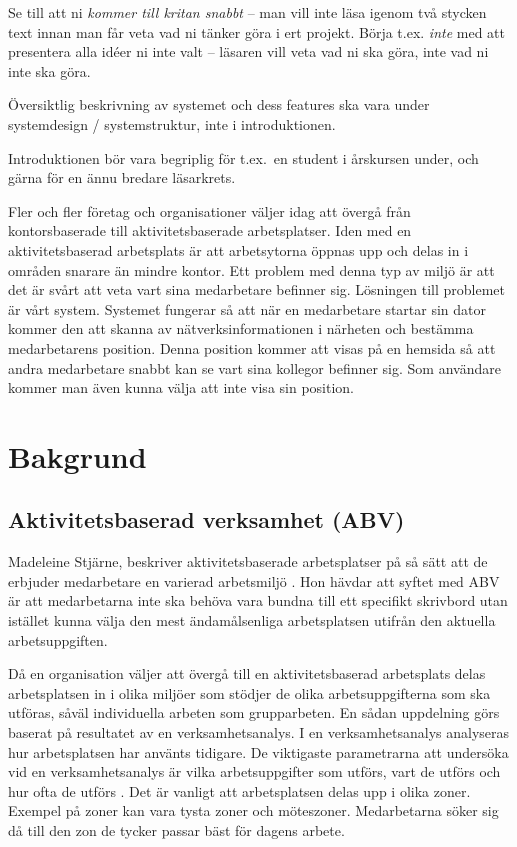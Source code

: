 \documentclass[swedish, a4paper,12pt]{article}
\begin{document}
Se till att ni \emph{kommer till kritan snabbt} – man vill inte läsa igenom två stycken text innan man får veta vad ni tänker göra i ert projekt.  Börja t.ex. \emph{inte} med att presentera alla idéer ni inte valt – läsaren vill veta vad ni ska göra, inte vad ni inte ska göra.

Översiktlig beskrivning av systemet och dess features ska vara under systemdesign / systemstruktur, inte i introduktionen.

Introduktionen bör vara begriplig för t.ex.~en student i årskursen under, och gärna för en ännu bredare läsarkrets.
\fi

Fler och fler företag och organisationer väljer idag att övergå från kontorsbaserade till aktivitetsbaserade arbetsplatser. Iden med en aktivitetsbaserad arbetsplats är att arbetsytorna öppnas upp och delas in i områden snarare än mindre kontor. Ett problem med denna typ av miljö är att det är svårt att veta vart sina medarbetare befinner sig. Lösningen till problemet är vårt system. Systemet fungerar så att när en medarbetare startar sin dator kommer den att skanna av nätverksinformationen i närheten och bestämma medarbetarens position. Denna position kommer att visas på en hemsida så att andra medarbetare snabbt kan se vart sina kollegor befinner sig. Som användare kommer man även kunna välja att inte visa sin position.

\section{Bakgrund}
\subsection{Aktivitetsbaserad verksamhet (ABV)}
Madeleine Stjärne, beskriver aktivitetsbaserade arbetsplatser på så sätt att de erbjuder medarbetare en varierad arbetsmiljö \cite{ABV}. Hon hävdar att syftet med ABV är att medarbetarna inte ska behöva vara bundna till ett specifikt skrivbord utan istället kunna välja den mest ändamålsenliga arbetsplatsen utifrån den aktuella arbetsuppgiften. %

Då en organisation väljer att övergå till en aktivitetsbaserad arbetsplats
delas arbetsplatsen in i olika miljöer som stödjer de olika arbetsuppgifterna som ska utföras, såväl individuella arbeten som grupparbeten. En sådan uppdelning görs baserat på resultatet av en verksamhetsanalys. I en verksamhetsanalys analyseras hur arbetsplatsen har använts tidigare. De viktigaste parametrarna att undersöka vid en verksamhetsanalys är vilka arbetsuppgifter som utförs, vart de utförs och hur ofta de utförs \cite{ABV}.
Det är vanligt att arbetsplatsen delas upp i olika zoner. Exempel på zoner kan vara tysta zoner och möteszoner. Medarbetarna söker sig då till den zon de tycker passar bäst för dagens arbete.
\end{document}
